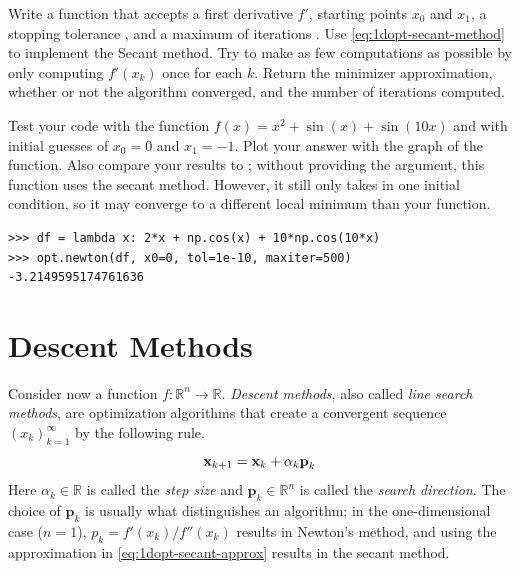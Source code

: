 \begin{problem} %
Write a function that accepts a first derivative $f'$, starting points $x_0$ and $x_1$, a stopping tolerance , and a maximum of iterations .
Use \eqref{eq:1dopt-secant-method} to implement the Secant method.
Try to make as few computations as possible by only computing $f'(x_k)$ once for each $k$.
Return the minimizer approximation, whether or not the algorithm converged, and the number of iterations computed.

Test your code with the function $f(x) = x^2 + \sin(x) + \sin(10x)$ and with initial guesses of $x_0 = 0$ and $x_1 = -1$.
Plot your answer with the graph of the function.
Also compare your results to ; without providing the  argument, this function uses the secant method.
However, it still only takes in one initial condition, so it may converge to a different local minimum than your function.

\begin{lstlisting}
>>> df = lambda x: 2*x + np.cos(x) + 10*np.cos(10*x)
>>> opt.newton(df, x0=0, tol=1e-10, maxiter=500)
-3.2149595174761636
\end{lstlisting}
\end{problem}

\section*{Descent Methods} %

Consider now a function $f:\mathbb{R}^n\rightarrow\mathbb{R}$.
\emph{Descent methods}, also called \emph{line search methods}, are optimization algorithms that create a convergent sequence $(x_k)_{k=1}^\infty$ by the following rule.
\begin{equation}
\mathbf{x}_{k+1} = \mathbf{x}_k + \alpha_k \textbf{p}_k
\end{equation}
Here $\alpha_k \in \mathbb{R}$ is called the \emph{step size} and $\textbf{p}_k \in \mathbb{R}^n$ is called the \emph{search direction}.
The choice of $\textbf{p}_k$ is usually what distinguishes an algorithm;
in the one-dimensional case ($n = 1$), $p_k = f'(x_k)/f''(x_k)$ results in Newton's method, and using the approximation in \eqref{eq:1dopt-secant-approx} results in the secant method.

